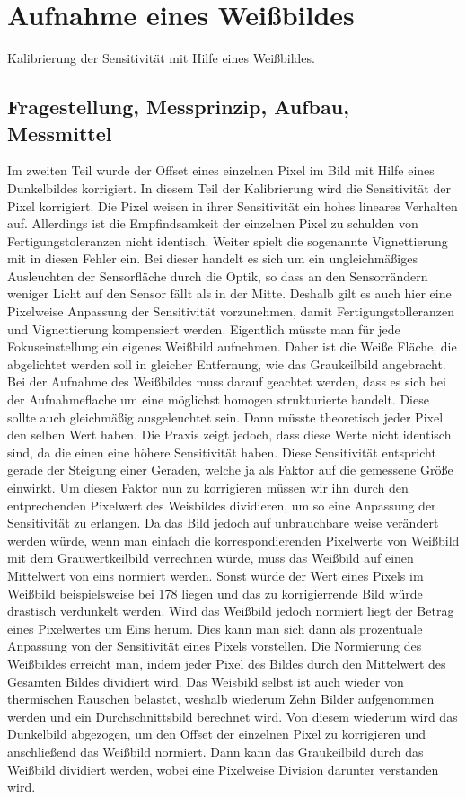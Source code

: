%
%
\chapter{Aufnahme eines Weißbildes}
\label{chap:VERSUCH_3}
Kalibrierung der Sensitivität mit Hilfe eines Weißbildes.
\section{Fragestellung, Messprinzip, Aufbau, Messmittel}
\label{chap:VERSUCH_3_FRAGESTELLUNG}
Im zweiten Teil wurde der Offset eines einzelnen Pixel im Bild mit Hilfe eines Dunkelbildes korrigiert. In diesem Teil der Kalibrierung wird die Sensitivität der Pixel korrigiert. Die Pixel weisen in ihrer Sensitivität ein hohes lineares Verhalten auf. Allerdings ist die Empfindsamkeit der einzelnen Pixel zu schulden von Fertigungstoleranzen nicht identisch. Weiter spielt die sogenannte Vignettierung mit in diesen Fehler ein. Bei dieser handelt es sich um ein ungleichmäßiges Ausleuchten der Sensorfläche durch die Optik, so dass an den Sensorrändern weniger Licht auf den Sensor fällt als in der Mitte. Deshalb gilt es auch hier eine Pixelweise Anpassung der Sensitivität vorzunehmen, damit Fertigungstolleranzen und Vignettierung kompensiert werden. Eigentlich müsste man für jede Fokuseinstellung ein eigenes Weißbild aufnehmen. Daher ist die Weiße Fläche, die abgelichtet werden soll in gleicher Entfernung, wie das Graukeilbild angebracht. 
Bei der Aufnahme des Weißbildes muss darauf geachtet werden, dass es sich bei der Aufnahmeflache um eine möglichst homogen strukturierte handelt. Diese sollte auch gleichmäßig ausgeleuchtet sein.
Dann müsste theoretisch jeder Pixel den selben Wert haben. Die Praxis zeigt jedoch, dass diese Werte nicht identisch sind, da die einen eine höhere Sensitivität haben. Diese Sensitivität entspricht gerade der Steigung einer Geraden, welche ja als Faktor auf die gemessene Größe einwirkt. Um diesen Faktor nun zu korrigieren müssen wir ihn durch den entprechenden Pixelwert des Weisbildes dividieren, um so eine Anpassung der Sensitivität zu erlangen. Da das Bild jedoch auf unbrauchbare weise verändert werden würde, wenn man einfach die korrespondierenden Pixelwerte von Weißbild mit dem Grauwertkeilbild verrechnen würde, muss das Weißbild auf einen Mittelwert von eins normiert werden. Sonst würde der Wert eines Pixels im Weißbild beispielsweise bei 178 liegen und das zu korrigierrende Bild würde drastisch verdunkelt werden. Wird das Weißbild jedoch normiert liegt der Betrag eines Pixelwertes um Eins herum. Dies kann man sich dann als prozentuale Anpassung von der Sensitivität eines Pixels vorstellen. Die Normierung des Weißbildes erreicht man, indem jeder Pixel des Bildes durch den Mittelwert des Gesamten Bildes dividiert wird.
Das Weisbild selbst ist auch wieder von thermischen Rauschen belastet, weshalb wiederum Zehn Bilder aufgenommen werden und ein Durchschnittsbild berechnet wird. Von diesem wiederum wird das Dunkelbild abgezogen, um den Offset der einzelnen Pixel zu korrigieren und anschließend das Weißbild normiert.
Dann kann das Graukeilbild durch das Weißbild dividiert werden, wobei eine Pixelweise Division darunter verstanden wird.

